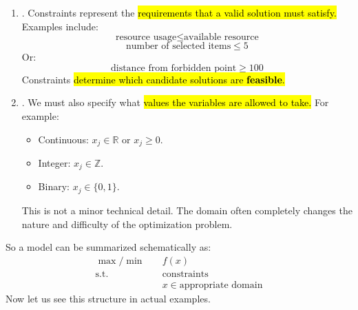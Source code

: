 \begin{enumerate}
    \item {}. Constraints represent the \hl{requirements that a valid solution must satisfy.} Examples include:
        \begin{equation*}
            \text{resource usage}\leq \text{available resource}
        \end{equation*}
        \begin{equation*}
            \text{number of selected items}\leq 5
        \end{equation*}
        Or:
        \begin{equation*}
            \text{distance from forbidden point}\geq 100
        \end{equation*}
        Constraints \hl{determine which candidate solutions are \textbf{feasible}.}

    \item {}. We must also specify what \hl{values the variables are allowed to take.} For example:
        \begin{itemize}
            \item Continuous: $x_j\in\mathbb R$ or $x_j\geq 0$.
            \item Integer: $x_j\in\mathbb Z$.
            \item Binary: $x_j\in\{0,1\}$.
        \end{itemize}
        This is not a minor technical detail. The domain often completely changes the nature and difficulty of the optimization problem.
\end{enumerate}
So a model can be summarized schematically as:
\begin{equation*}
    \begin{aligned}
        \max/\min\quad & f(x)\\
        \text{s.t.}\quad & \text{constraints}\\
        & x\in\text{appropriate domain}
    \end{aligned}
\end{equation*}
Now let us see this structure in actual examples.

